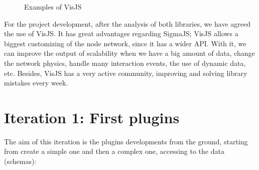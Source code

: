 \documentclass[a4paper, 12pt]{book}
\begin{document}
\begin{figure}[H]
 \centering
 \caption{Examples of VisJS}
 \label{f:sigmaexamples}
\end{figure}

For the project development, after the analysis of both libraries, we have agreed the use of VisJS. It has great advantages regarding SigmaJS; VisJS allows a biggest customizing of the node network, since it has a wider API. With it, we can improve the output of scalability when we have a big amount of data, change the network physics, handle many interaction events, the use of dynamic data, etc. Besides, VisJS has a very active community, improving and solving library mistakes every week.

\section{Iteration 1: First plugins}

The aim of this iteration is the plugins developments from the ground, starting from create a simple one and then a complex one, accessing to the data (schemas):
\end{document}
